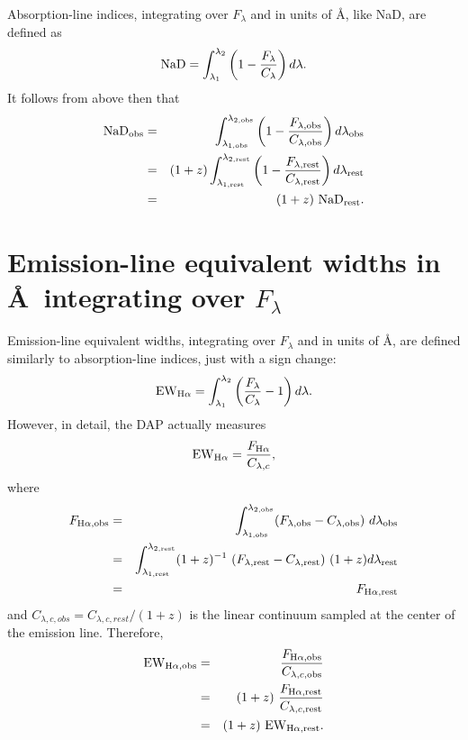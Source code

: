 \documentclass[a4paper]{article}
\begin{document}
Absorption-line indices, integrating over $F_\lambda$ and in units of \AA, like NaD, are defined as
%
\begin{equation}
{\rm NaD} = \int^{\lambda_2}_{\lambda_1} \left(1 - \frac{F_\lambda}{C_\lambda}\right) d\lambda .
\end{equation}
%
It follows from above then that
\begin{eqnarray}
{\rm NaD}_{\rm obs} & = & \int^{\lambda_{2,{\rm obs}}}_{\lambda_{1,{\rm obs}}} \left(1 - \frac{F_{\lambda,{\rm obs}}}{C_{\lambda,{\rm obs}}}\right) d\lambda_{\rm obs} \\
& = & (1+z) \int^{\lambda_{2,{\rm rest}}}_{\lambda_{1,{\rm rest}}} \left(1 - \frac{F_{\lambda,{\rm rest}}}{C_{\lambda,{\rm rest}}}\right) d\lambda_{\rm rest} \\
& = & (1+z)\ {\rm NaD}_{\rm rest} .
\end{eqnarray}
%

\section{Emission-line equivalent widths in \AA\ integrating over $F_\lambda$}

Emission-line equivalent widths, integrating over $F_\lambda$ and in units of \AA, are defined similarly to absorption-line indices, just with a sign change:
%
\begin{equation}
{\rm EW}_{{\rm H}\alpha} = \int^{\lambda_2}_{\lambda_1} \left(\frac{F_\lambda}{C_\lambda} - 1\right) d\lambda.
\end{equation}
%
However, in detail, the DAP actually measures
%
\begin{equation}
{\rm EW}_{{\rm H}\alpha} = \frac{F_{{\rm H}\alpha}}{C_{\lambda,c}},
\end{equation}
%
where
%
\begin{eqnarray}
F_{{\rm H}\alpha,{\rm obs}} & = & \int^{\lambda_{2,{\rm obs}}}_{\lambda_{1,{\rm obs}}} (F_{\lambda,{\rm obs}} - C_{\lambda,{\rm obs}})\ d\lambda_{\rm obs} \\
 & = & \int^{\lambda_{2,{\rm rest}}}_{\lambda_{1,{\rm rest}}} (1+z)^{-1}\ (F_{\lambda,{\rm rest}} - C_{\lambda,{\rm rest}})\ (1+z) d\lambda_{\rm rest} \\
 & = &  F_{{\rm H}\alpha,{\rm rest}}
\end{eqnarray}
%
and $C_{\lambda,c,obs} = C_{\lambda,c,rest}/(1+z)$ is the linear continuum sampled at the center of the emission line.  Therefore,
%
\begin{eqnarray}
{\rm EW}_{{\rm H}\alpha,{\rm obs}} & = & \frac{F_{{\rm H}\alpha,{\rm obs}}}{C_{\lambda,c,{\rm obs}}} \\
& = & (1+z)\ \frac{F_{{\rm H}\alpha,{\rm rest}}}{C_{\lambda,c,{\rm rest}}} \\
 & = & (1+z)\ {\rm EW}_{{\rm H}\alpha,{\rm rest}}.
\end{eqnarray}
\end{document}
